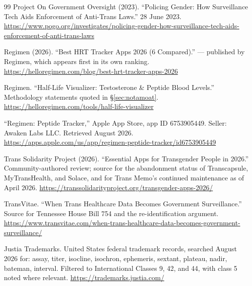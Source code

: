 \documentclass[11pt,a4paper]{article}
\newcommand{\bad}[1]{\obs{#1}}
\begin{document}
\begin{thebibliography}{99}
Project On Government Oversight (2023). ``Policing Gender: How
Surveillance Tech Aids Enforcement of Anti-Trans Laws.'' 28 June 2023.
\url{https://www.pogo.org/investigates/policing-gender-how-surveillance-tech-aids-enforcement-of-anti-trans-laws}

Regimen (2026). ``Best HRT Tracker Apps 2026 (6 Compared).''
\bad{Interested source} --- published by Regimen, which appears first
in its own ranking.
\url{https://helloregimen.com/blog/best-hrt-tracker-apps-2026}

Regimen. ``Half-Life Visualizer: Testosterone \& Peptide Blood
Levels.'' Methodology statements quoted in \S\ref{sec:notamoat}.
\url{https://helloregimen.com/tools/half-life-visualizer}

``Regimen: Peptide Tracker,'' Apple App Store, app ID 6753905449.
Seller: Awaken Labs LLC. Retrieved August 2026.
\url{https://apps.apple.com/us/app/regimen-peptide-tracker/id6753905449}

Trans Solidarity Project (2026). ``Essential Apps for Transgender
People in 2026.'' Community-authored review; source for the
abandonment status of Transcapsule, MyTransHealth, and Solace, and for
Trans Memo's continued maintenance as of April 2026.
\url{https://transsolidarityproject.org/transgender-apps-2026/}

TransVitae. ``When Trans Healthcare Data Becomes Government
Surveillance.'' Source for Tennessee House Bill 754 and the
re-identification argument.
\url{https://www.transvitae.com/when-trans-healthcare-data-becomes-government-surveillance/}

Justia Trademarks. United States federal trademark records, searched
August 2026 for: assay, titer, isocline, isochron, ephemeris, sextant,
plateau, nadir, bateman, interval. Filtered to International Classes 9,
42, and 44, with class 5 noted where relevant.
\url{https://trademarks.justia.com/}

\end{thebibliography}
\end{document}
